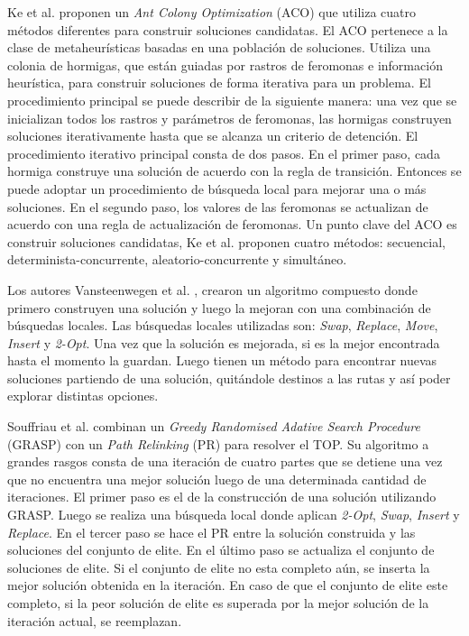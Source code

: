 \bigskip

Ke et al. \cite{KeArchettiFeng} proponen un \textit{Ant Colony Optimization} (ACO) que utiliza cuatro métodos diferentes para construir soluciones candidatas. El ACO pertenece a la clase de metaheurísticas basadas en una población de soluciones. Utiliza una colonia de hormigas, que están guiadas por rastros de feromonas e información heurística, para construir soluciones de forma iterativa para un problema. El procedimiento principal se puede describir de la siguiente manera: una vez que se inicializan todos los rastros y parámetros de feromonas, las hormigas construyen soluciones iterativamente hasta que se alcanza un criterio de detención. El procedimiento iterativo principal consta de dos pasos. En el primer paso, cada hormiga construye una solución de acuerdo con la regla de transición. Entonces se puede adoptar un procedimiento de búsqueda local para mejorar una o más soluciones. En el segundo paso, los valores de las feromonas se actualizan de acuerdo con una regla de actualización de feromonas. Un punto clave del ACO es construir soluciones candidatas, Ke et al. \cite{KeArchettiFeng} proponen cuatro métodos: secuencial, determinista-concurrente, aleatorio-concurrente y simultáneo.

\bigskip

Los autores Vansteenwegen et al. \cite{VansteenwegenSouffriauBergheOudheusden}, crearon un algoritmo compuesto donde primero construyen una solución y luego la mejoran con una combinación de búsquedas locales. Las búsquedas locales utilizadas son: \textit{Swap}, \textit{Replace}, \textit{Move}, \textit{Insert} y \textit{2-Opt}. Una vez que la solución es mejorada, si es la mejor encontrada hasta el momento la guardan. Luego tienen un método para encontrar nuevas soluciones partiendo de una solución, quitándole destinos a las rutas y así poder explorar distintas opciones.

\bigskip

Souffriau et al. \cite{SouffriauVansteenwegenBergheOudheusden} combinan un \textit{Greedy Randomised Adative Search Procedure} (GRASP) con un \textit{Path Relinking} (PR) para resolver el TOP. Su algoritmo a grandes rasgos consta de una iteración de cuatro partes que se detiene una vez que no encuentra una mejor solución luego de una determinada cantidad de iteraciones. El primer paso es el de la construcción de una solución utilizando GRASP. Luego se realiza una búsqueda local donde aplican \textit{2-Opt}, \textit{Swap}, \textit{Insert} y \textit{Replace}. En el tercer paso se hace el PR entre la solución construida y las soluciones del conjunto de elite. En el último paso se actualiza el conjunto de soluciones de elite. Si el conjunto de elite no esta completo aún, se inserta la mejor solución obtenida en la iteración. En caso de que el conjunto de elite este completo, si la peor solución de elite es superada por la mejor solución de la iteración actual, se reemplazan.

